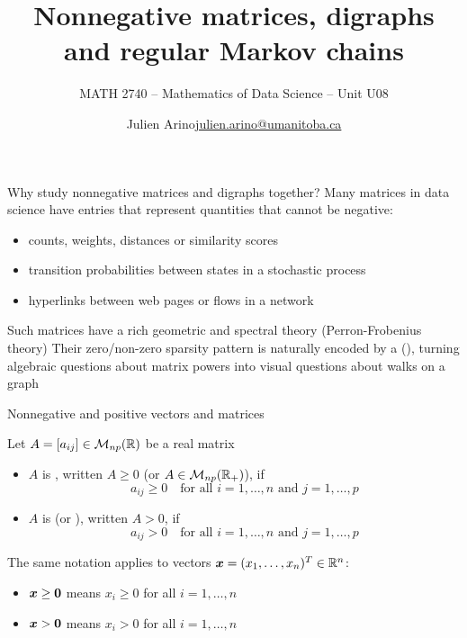 \documentclass[aspectratio=169]{beamer}\usepackage[]{graphicx}\usepackage[]{xcolor}
\subtitle{MATH 2740 -- Mathematics of Data Science -- Unit U08}
\author{\texorpdfstring{Julien Arino\newline\url{julien.arino@umanitoba.ca}}{Julien Arino}}
\institute{Department of Mathematics @ University of Manitoba}
\title{Nonnegative matrices, digraphs and regular Markov chains}
\begin{document}
\setcounter{theorem}{106}

\SStitlepage
\SSoutlinepage



\begin{frame}{Why study nonnegative matrices and digraphs together?}
Many matrices in data science have entries that represent quantities that cannot be negative:
\begin{itemize}
\item counts, weights, distances or similarity scores
\item transition probabilities between states in a stochastic process
\item hyperlinks between web pages or flows in a network
\end{itemize}
\vfill
Such matrices have a rich geometric and spectral theory (Perron-Frobenius theory)
\vfill
Their zero/non-zero sparsity pattern is naturally encoded by a  (), turning algebraic questions about matrix powers into visual questions about walks on a graph
\end{frame}

\begin{frame}{Nonnegative and positive vectors and matrices}
\begin{importantdefinition}
Let $A = [a_{ij}] \in \mathcal{M}_{np}(\mathbb{R})$ be a real matrix
\begin{itemize}
\item $A$ is , written $A \ge 0$ (or $A \in \mathcal{M}_{np}(\mathbb{R}_+)$), if
\[
a_{ij} \ge 0 \quad \text{for all } i = 1,\ldots,n \text{ and } j = 1,\ldots,p
\]
\item $A$ is  (or ), written $A > 0$, if
\[
a_{ij} > 0 \quad \text{for all } i = 1,\ldots,n \text{ and } j = 1,\ldots,p
\]
\end{itemize}
\end{importantdefinition}
\vfill
The same notation applies to vectors $\bm{x} = (x_1,\ldots,x_n)^T \in \mathbb{R}^n$:
\begin{itemize}
\item $\bx \ge \b0$ means $x_i \ge 0$ for all $i = 1,\ldots,n$
\item $\bx > \b0$ means $x_i > 0$ for all $i = 1,\ldots,n$
\end{itemize}
\end{frame}
\end{document}
